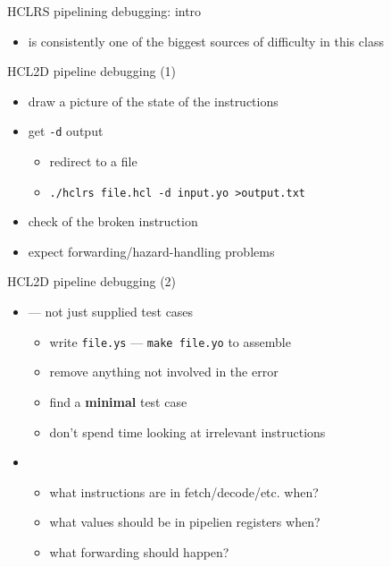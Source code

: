 \begin{frame}{HCLRS pipelining debugging: intro}
    \begin{itemize}
    \item {} is consistently 
          one of the biggest sources of difficulty in this class
    \end{itemize}
\end{frame}

\begin{frame}[fragile,label=pipeDebugOne]{HCL2D pipeline debugging (1)}
    \begin{itemize}
    \item draw a picture of the state of the instructions
    \item get {\tt -d} output
        \begin{itemize}
            \item redirect to a file
            \item \verb|./hclrs file.hcl -d input.yo >output.txt|
        \end{itemize}
    \item check  of the broken instruction
    \item expect forwarding/hazard-handling problems
    \end{itemize}
\end{frame}

\begin{frame}{HCL2D pipeline debugging (2)}
    \begin{itemize}
    \item {} --- not just supplied test cases
        \begin{itemize}
        \item write {\tt file.ys} --- {\tt make file.yo} to assemble
        \item remove anything not involved in the error
        \item find a \textbf{minimal} test case
        \item don't spend time looking at irrelevant instructions
        \end{itemize}
    \item {}
        \begin{itemize}
        \item what instructions are in fetch/decode/etc. when?
        \item what values should be in pipelien registers when?
        \item what forwarding should happen?
        \end{itemize}
    \end{itemize}
\end{frame}


